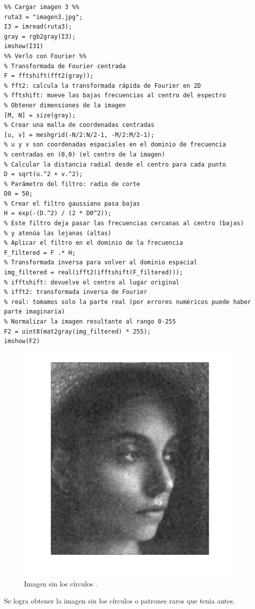 \documentclass[11pt, letterpaper]{article}
\begin{document}
\begin{verbatim}
%% Cargar imagen 3 %%
ruta3 = "imagen3.jpg";
I3 = imread(ruta3);
gray = rgb2gray(I3);
imshow(I31)
%% Verlo con Fourier %%
% Transformada de Fourier centrada
F = fftshift(fft2(gray)); 
% fft2: calcula la transformada rápida de Fourier en 2D
% fftshift: mueve las bajas frecuencias al centro del espectro
% Obtener dimensiones de la imagen
[M, N] = size(gray);
% Crear una malla de coordenadas centradas
[u, v] = meshgrid(-N/2:N/2-1, -M/2:M/2-1); 
% u y v son coordenadas espaciales en el dominio de frecuencia
% centradas en (0,0) (el centro de la imagen)
% Calcular la distancia radial desde el centro para cada punto
D = sqrt(u.^2 + v.^2);
% Parámetro del filtro: radio de corte
D0 = 50; 
% Crear el filtro gaussiano pasa bajas
H = exp(-(D.^2) / (2 * D0^2)); 
% Este filtro deja pasar las frecuencias cercanas al centro (bajas)
% y atenúa las lejanas (altas)
% Aplicar el filtro en el dominio de la frecuencia
F_filtered = F .* H;
% Transformada inversa para volver al dominio espacial
img_filtered = real(ifft2(ifftshift(F_filtered))); 
% ifftshift: devuelve el centro al lugar original
% ifft2: transformada inversa de Fourier
% real: tomamos solo la parte real (por errores numéricos puede haber parte imaginaria)
% Normalizar la imagen resultante al rango 0-255
F2 = uint8(mat2gray(img_filtered) * 255); 
imshow(F2)
\end{verbatim}

\begin{figure}[h!]
\centering
\begin{minipage}{0.7\textwidth}
	\centering
	\includegraphics[width=\textwidth]{R5.png}
	\caption{Imagen sin los círculos .}
	\label{fig:f6}
\end{minipage}\hfill
\end{figure}

Se logra obtener la imagen sin los círculos o patrones raros que tenia antes.
	
	
\end{document}
